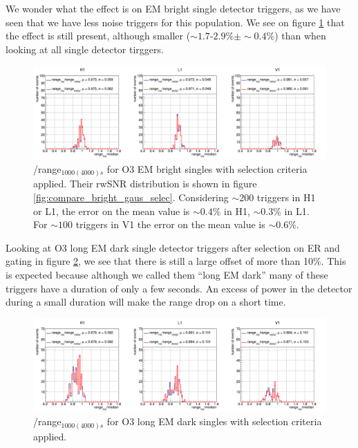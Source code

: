 We wonder what the effect is on EM bright single detector triggers, as we have seen that we have less noise triggers for this population.
We see on figure \ref{fig:rangeRatioEMbright} that the effect is still present, although smaller ($\sim 1.7\text{-}2.9\% \pm \sim 0.4\%$) than when looking at all single detector tirggers.
\begin{figure}[H]
  \centering
  \includegraphics[width=\linewidth]{sectionBadTriggers/PSD/Range/range_ratio/cRatioMed_bright.png}
  \caption{\medr{}/range$_{1000(4000)s}$ for O3 EM bright singles with selection criteria applied. Their rwSNR distribution is shown in figure \ref{fig:compare_bright_gaus_selec}. Considering $\sim 200$ triggers in H1 or L1, the error on the mean value is $\sim 0.4\%$ in H1, $\sim 0.3\%$ in L1. For $\sim 100$ triggers in V1 the error on the mean value is $\sim 0.6\%$.}
  \label{fig:rangeRatioEMbright}
\end{figure}

Looking at O3 long EM dark single detector triggers after selection on ER and gating in figure \ref{fig:rangeRatioEMdarkLong}, we see that there is still a large offset of more than 10\%.
This is expected because although we called them ``long EM dark'' many of these triggers have a duration of only a few seconds.
An excess of power in the detector during a small duration will make the range drop on a short time.
\begin{figure}[H]
  \centering
  \includegraphics[width=\linewidth]{sectionBadTriggers/PSD/Range/range_ratio/cRatioMed_darkLong.png}
  \caption{\medr{}/range$_{1000(4000)s}$ for O3 long EM dark singles with selection criteria applied.}
  \label{fig:rangeRatioEMdarkLong}
\end{figure}

